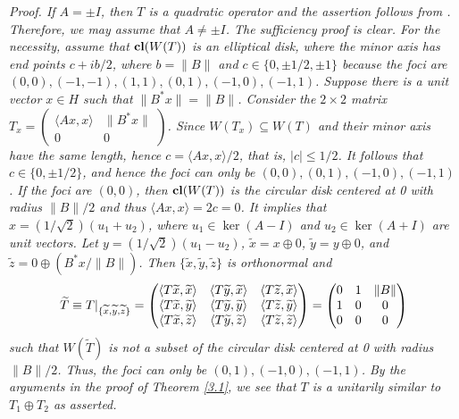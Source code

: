 \documentclass[11pt]{article}
\numberwithin{equation}{section}
\def\cl{{\bf cl}}
\begin{document}
\noindent
\it Proof. \rm
If $A=\pm I$, then $T$ is a quadratic operator and the assertion follows from \cite[Theorem 2.1]{TW}. Therefore, we may assume that $A\neq\pm I$.
The sufficiency proof is clear.
For the necessity, assume that $\cl (W(T))$ is an elliptical disk, where the minor axis
has end points $c+ib/2$, where $b = \|B\|$ and $c \in \{0, \pm 1/2, \pm 1\}$
because the foci are $(0,0), (-1,-1), (1,1), (0,1), (-1,0), (-1,1)$.
Suppose there is a unit vector $x\in H$
such that $\|B^*x\| = \|B\|$.  Consider the $2\times 2$ matrix $T_x=\begin{pmatrix} \langle Ax, x\rangle & \|B^*x\| \\ 0 & 0\end{pmatrix}$. Since $W(T_x)\subseteq W(T)$ and their minor axis have the same length, hence $c=\langle Ax, x\rangle/2$, that is, $|c|\le 1/2$.
It follows that
$c \in\{ 0, \pm 1/2\}$, and hence the foci can only be
$(0,0), (0,1), (-1,0), (-1,1)$.
If the foci are $(0,0)$, then $\cl (W(T))$ is the circular disk centered at 0 with radius
$\|B\|/2$ and thus $\langle Ax, x\rangle=2c=0$.
It implies that $x=(1/\sqrt{2})(u_1+u_2)$, where $u_1\in \ker(A-I)$ and $u_2\in\ker (A+I)$ are unit vectors.
Let $y=(1/\sqrt{2})(u_1-u_2)$,
$\widetilde{x}=x\oplus 0$,
$\widetilde{y}=y\oplus 0$,
and $\widetilde{z}=0\oplus (B^*x/\|B\|)$.
Then $\{\widetilde{x}, \widetilde{y}, \widetilde{z}\}$ is orthonormal and
$$\widetilde{T} \equiv  T|_{\{\widetilde{x}, \widetilde{y}, \widetilde{z}\}} =\begin{pmatrix}
\langle T\widetilde{x}, \widetilde{x}\rangle & \langle T\widetilde{y}, \widetilde{x}\rangle & \langle T\widetilde{z}, \widetilde{x}\rangle\cr
\langle T\widetilde{x}, \widetilde{y}\rangle & \langle T\widetilde{y}, \widetilde{y}\rangle & \langle T\widetilde{z}, \widetilde{y}\rangle\cr
\langle T\widetilde{x}, \widetilde{z}\rangle & \langle T\widetilde{y}, \widetilde{z}\rangle & \langle T\widetilde{z}, \widetilde{z}\rangle\cr
\end{pmatrix}= \begin{pmatrix} 0 & 1 & \|B\|\cr 1 & 0 & 0 \cr 0 & 0 & 0 \cr\end{pmatrix}$$
such that $W(\widetilde{T})$ is not a subset of the circular disk centered at 0 with radius
$\|B\|/2$. Thus, the foci can only be $(0,1), (-1,0), (-1,1)$. By the arguments in the proof of
Theorem \ref{3.1}, we see that $T$ is a unitarily similar to $T_1 \oplus T_2$ as asserted.
\end{document}
